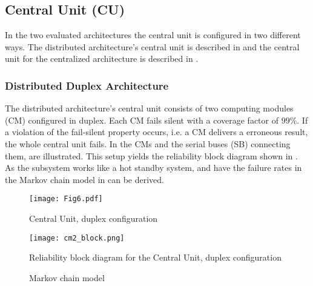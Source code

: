 \subsection{Central Unit (CU)}
In the two evaluated architectures the central unit is configured in two different ways. The distributed architecture's central unit is described in  and the central unit for the centralized architecture is described in . 

\subsubsection{Distributed Duplex Architecture}
\label{subsec:dda}
The distributed architecture's central unit consists of two computing modules (CM) configured in duplex. Each CM fails silent with a coverage factor of $99\%$. If a violation of the fail-silent property occurs, i.e. a CM delivers a erroneous result, the whole central unit fails. In  the CMs and the serial buses (SB) connecting them, are illustrated. This setup yields the reliability block diagram shown in . As the subsystem works like a hot standby system, and have the failure rates in  the Markov chain model in  can be derived.

\begin{figure}[H]
  \centering
  \texttt{[image: Fig6.pdf]}
  \caption{Central Unit, duplex configuration }
  \label{fig6}
\end{figure}
\begin{figure}[H]
  \centering
  \texttt{[image: cm2\_block.png]}
  \caption{Reliability block diagram for the Central Unit, duplex configuration}
  \label{fig7}
\end{figure}
\begin{figure}[h!]
  \begin{center}
  \caption{Markov chain model}
\end{center}
\end{figure}



